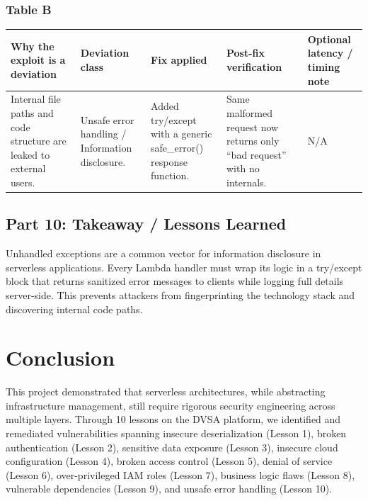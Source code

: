 \documentclass[12pt]{report}
\begin{document}
\subsection*{Table B}
\begin{table}[H]
  \footnotesize
  \centering
  \begin{tabularx}{\textwidth}{|Y|Y|Y|Y|Y|}
    \hline
    \textbf{Why the exploit is a deviation} & \textbf{Deviation class} & \textbf{Fix applied} & \textbf{Post-fix verification} & \textbf{Optional latency / timing note} \\
    \hline
    Internal file paths and code structure are leaked to external users. &
    Unsafe error handling / Information disclosure. &
    Added try/except with a generic safe\_error() response function. &
    Same malformed request now returns only ``bad request'' with no internals. &
    N/A \\
    \hline
  \end{tabularx}
\end{table}

\section{Part 10: Takeaway / Lessons Learned}
Unhandled exceptions are a common vector for information disclosure in serverless applications. Every Lambda handler must wrap its logic in a try/except block that returns sanitized error messages to clients while logging full details server-side. This prevents attackers from fingerprinting the technology stack and discovering internal code paths.

\clearpage


\chapter*{Conclusion}

This project demonstrated that serverless architectures, while abstracting infrastructure management, still require rigorous security engineering across multiple layers. Through 10 lessons on the DVSA platform, we identified and remediated vulnerabilities spanning insecure deserialization (Lesson 1), broken authentication (Lesson 2), sensitive data exposure (Lesson 3), insecure cloud configuration (Lesson 4), broken access control (Lesson 5), denial of service (Lesson 6), over-privileged IAM roles (Lesson 7), business logic flaws (Lesson 8), vulnerable dependencies (Lesson 9), and unsafe error handling (Lesson 10).
\end{document}
